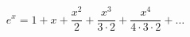 \documentclass[12pt]{article}
\begin{document}
\sicpsize
\[
e^x = 1 + x + \frac{x^2}{2} + \frac{x^3}{3 \cdot 2} + \frac{x^4}{4 \cdot 3 \cdot 2} + \dots
\]
\end{document}
